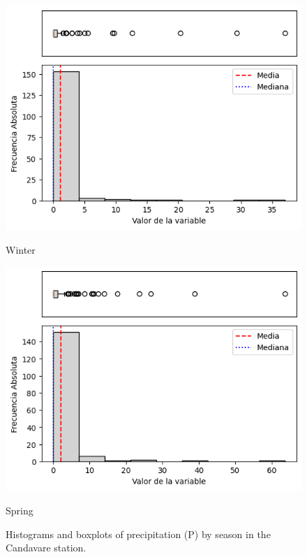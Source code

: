 \begin{figure}[H]
\begin{minipage}{0.30\textwidth}
  \includegraphics[width=\linewidth]{resultados/por_estacion_del_anio/boxplot_clases_por_estacion/Candavare/P_HistBoxplot_Winter.png}
  \caption*{Winter}
\end{minipage}
\hfill
\begin{minipage}{0.30\textwidth}
  \includegraphics[width=\linewidth]{resultados/por_estacion_del_anio/boxplot_clases_por_estacion/Candavare/P_HistBoxplot_Spring.png}
  \caption*{Spring}
\end{minipage}
\caption{Histograms and boxplots of precipitation (P) by season in the Candavare station.}
\label{fig:candavare_p_hist}
\end{figure}

